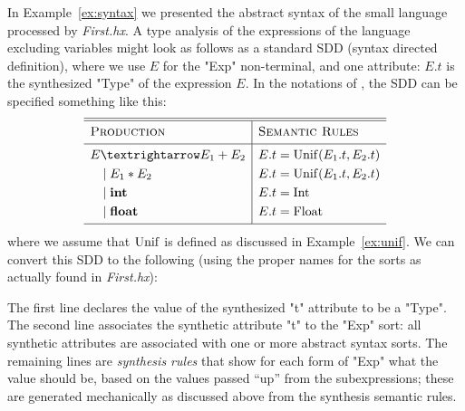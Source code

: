 \documentclass[11pt]{article} %
\begin{document}
\begin{example}\label{ex:collect}
  In Example~\ref{ex:syntax} we presented the abstract syntax of the small language processed by
  \emph{First.hx}. A type analysis of the expressions of the language excluding variables might look
  as follows as a standard SDD (syntax directed definition), where we use $E$ for the "Exp"
  non-terminal, and one attribute: $E.t$ is the synthesized "Type" of the expression $E$.  In the
  notations of \cite{Aho+:2006}, the SDD can be specified something like this:
  \begin{equation*}
    \begin{array}{l|l}
      \hline
      \hline
      \textsc{Production}  & \textsc{Semantic Rules} \Bigstrut\\
      \hline
      E → E_1 + E_2 & E.t = \op{Unif}(E_1.t, E_2.t) \Bigstrut\\[\jot]
      \quad\mid E_1 \ast E_2 & E.t = \op{Unif}(E_1.t, E_2.t) \\[\jot]
      \quad\mid \textbf{int} & E.t = \op{Int} \\[\jot]
      \quad\mid \textbf{float} & E.t = \op{Float} \\[\jot]
      \hline
    \end{array}
  \end{equation*}
  where we assume that $\operatorname{Unif}$ is defined as discussed in Example~\ref{ex:unif}.
  We can convert this SDD to the following \HAX (using the proper names for the sorts as actually
  found in \emph{First.hx}):
  The first line declares the value of the synthesized "t" attribute to be a "Type".
  The second line associates the synthetic attribute "t" to the "Exp" sort: all synthetic
  attributes are associated with one or more abstract syntax sorts.
  The remaining lines are \emph{synthesis rules} that show for each form of "Exp" what the value
  should be, based on the values passed ``up'' from the subexpressions; these are generated
  mechanically as discussed above from the synthesis semantic rules.
\end{example}
\end{document}
